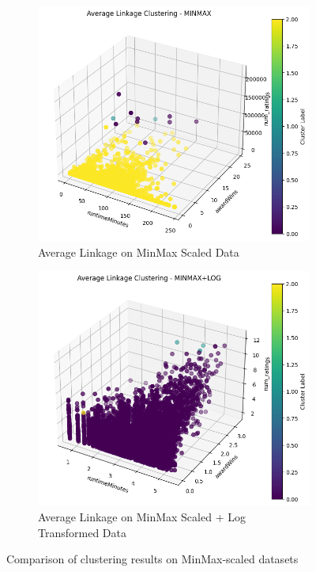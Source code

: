 \documentclass[10pt]{article}
\begin{document}
\begin{figure}[ht!]
    \centering
    \begin{subfigure}[b]{0.45\textwidth}
        \centering
        \includegraphics[width=\textwidth]{avglink_minmax.png}
        \caption{Average Linkage on MinMax Scaled Data}
        \label{fig:img1}
    \end{subfigure}
    \hfill
    \begin{subfigure}[b]{0.45\textwidth}
        \centering
        \includegraphics[width=\textwidth]{avglink_minmaxlog.png}
        \caption{Average Linkage on MinMax Scaled + Log Transformed Data}
        \label{fig:img2}
    \end{subfigure}
    \caption{Comparison of clustering results on MinMax-scaled datasets}
    \label{fig:confronto_MinMax}
\end{figure}
\end{document}

